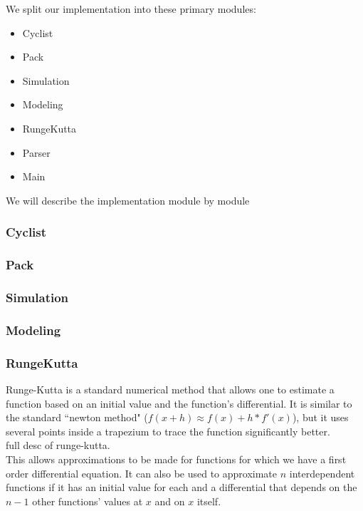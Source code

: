 \documentclass[10pt, a4paper]{report}
\begin{document}
We split our implementation into these primary modules:
\begin{itemize}
\item Cyclist
\item Pack
\item Simulation
\item Modeling
\item RungeKutta
\item Parser
\item Main
\end{itemize}

We will describe the implementation module by module

\subsubsection{Cyclist}

\subsubsection{Pack}

\subsubsection{Simulation}

\subsubsection{Modeling}

\subsubsection{RungeKutta}


Runge-Kutta is a standard numerical method that allows one to estimate a function based on an initial value and the function's differential. It is similar to the standard ``newton method" ($f(x + h) \approx f(x) + h*f'(x)$), but it uses several points inside a trapezium to trace the function significantly better. \\ %
\newline
full desc of runge-kutta.\\
\newline
This allows approximations to be made for functions for which we have a first order differential equation. It can also be used to approximate $n$ interdependent functions if it has an initial value for each and a differential that depends on the $n - 1$ other functions' values at $x$ and on $x$ itself.\\
\end{document}
